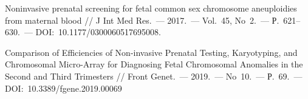 \begin{thebibliography}{99}
\bibitem{} Noninvasive prenatal screening for fetal common sex chromosome aneuploidies from maternal blood // J Int Med Res.~--- 2017.~--- Vol.~45, No~2.~--- Р.~621--630.~--- DOI:~10.1177/0300060517695008.

\bibitem{} Comparison of Efficiencies of Non-invasive Prenatal Testing, Karyotyping, and Chromosomal Micro-Array for Diagnosing Fetal Chromosomal Anomalies in the Second and Third Trimesters // Front Genet.~--- 2019.~--- No~10.~--- Р.~69.~--- DOI:~10.3389/fgene.2019.00069
\end{thebibliography}
